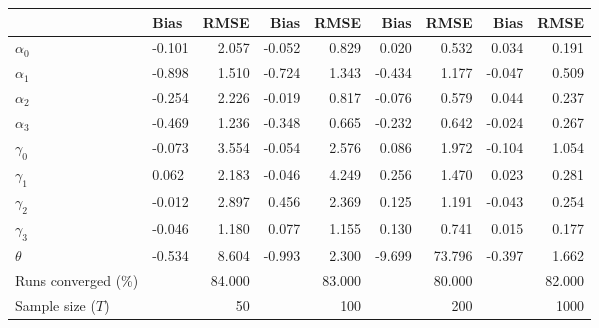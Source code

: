 
\begin{tabular}[t]{llrrrrrrr}
\toprule
  & Bias & RMSE & Bias & RMSE & Bias & RMSE & Bias & RMSE\\
\midrule
$\alpha_{0}$ & -0.101 & 2.057 & -0.052 & 0.829 & 0.020 & 0.532 & 0.034 & 0.191\\
$\alpha_{1}$ & -0.898 & 1.510 & -0.724 & 1.343 & -0.434 & 1.177 & -0.047 & 0.509\\
$\alpha_{2}$ & -0.254 & 2.226 & -0.019 & 0.817 & -0.076 & 0.579 & 0.044 & 0.237\\
$\alpha_{3}$ & -0.469 & 1.236 & -0.348 & 0.665 & -0.232 & 0.642 & -0.024 & 0.267\\
$\gamma_{0}$ & -0.073 & 3.554 & -0.054 & 2.576 & 0.086 & 1.972 & -0.104 & 1.054\\
$\gamma_{1}$ & 0.062 & 2.183 & -0.046 & 4.249 & 0.256 & 1.470 & 0.023 & 0.281\\
$\gamma_{2}$ & -0.012 & 2.897 & 0.456 & 2.369 & 0.125 & 1.191 & -0.043 & 0.254\\
$\gamma_{3}$ & -0.046 & 1.180 & 0.077 & 1.155 & 0.130 & 0.741 & 0.015 & 0.177\\
$\theta$ & -0.534 & 8.604 & -0.993 & 2.300 & -9.699 & 73.796 & -0.397 & 1.662\\
Runs converged (\%) &  & 84.000 &  & 83.000 &  & 80.000 &  & 82.000\\
Sample size ($T$) &  & 50 &  & 100 &  & 200 &  & 1000\\
\bottomrule
\end{tabular}
